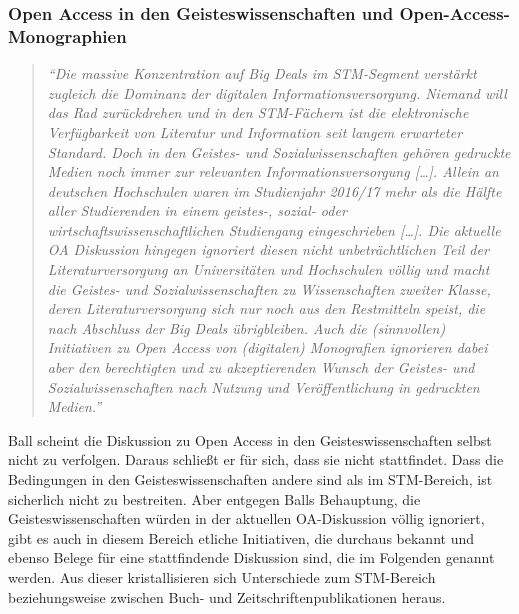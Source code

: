 \documentclass[a4paper,
fontsize=11pt,
oneside,
numbers=noperiodatend,
parskip=half-,
bibliography=totoc,
final
]{scrartcl}
\begin{document}
\subsubsection{Open Access in den Geisteswissenschaften und
Open-Access-Monographien}\label{open-access-in-den-geisteswissenschaften-und-open-access-monographien}

\begin{quote}
\emph{\enquote{Die massive Konzentration auf Big Deals im STM-Segment
verstärkt zugleich die Dominanz der digitalen Informationsversorgung.
Niemand will das Rad zurückdrehen und in den STM-Fächern ist die
elektronische Verfügbarkeit von Literatur und Information seit langem
erwarteter Standard. Doch in den Geistes- und Sozialwissenschaften
gehören gedruckte Medien noch immer zur relevanten
Informationsversorgung {[}\ldots{}{]}. Allein an deutschen Hochschulen
waren im Studienjahr 2016/17 mehr als die Hälfte aller Studierenden in
einem geistes-, sozial- oder wirtschaftswissenschaftlichen Studiengang
eingeschrieben {[}\ldots{}{]}. Die aktuelle OA Diskussion hingegen
ignoriert diesen nicht unbeträchtlichen Teil der Literaturversorgung an
Universitäten und Hochschulen völlig und macht die Geistes- und
Sozialwissenschaften zu Wissenschaften zweiter Klasse, deren
Literaturversorgung sich nur noch aus den Restmitteln speist, die nach
Abschluss der Big Deals übrigbleiben. Auch die (sinnvollen) Initiativen
zu Open Access von (digitalen) Monografien ignorieren dabei aber den
berechtigten und zu akzeptierenden Wunsch der Geistes- und
Sozialwissenschaften nach Nutzung und Veröffentlichung in gedruckten
Medien.}}
\end{quote}

Ball scheint die Diskussion zu Open Access in den Geisteswissenschaften
selbst nicht zu verfolgen. Daraus schließt er für sich, dass sie nicht
stattfindet. Dass die Bedingungen in den Geisteswissenschaften andere
sind als im STM-Bereich, ist sicherlich nicht zu bestreiten. Aber
entgegen Balls Behauptung, die Geisteswissenschaften würden in der
aktuellen OA-Diskussion völlig ignoriert, gibt es auch in diesem Bereich
etliche Initiativen, die durchaus bekannt und ebenso Belege für eine
stattfindende Diskussion sind, die im Folgenden genannt werden. Aus
dieser kristallisieren sich Unterschiede zum STM-Bereich beziehungsweise
zwischen Buch- und Zeitschriftenpublikationen heraus.
\end{document}
